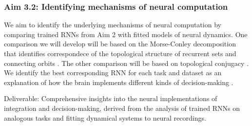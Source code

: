 \documentclass[12pt,letterpaper, onecolumn]{article}
\theoremstyle{definition}
\theoremstyle{remark}
\begin{document}
\subsubsection*{Aim 3.2: Identifying mechanisms of neural computation}
We aim to identify the underlying mechanisms of neural computation by comparing trained RNNs from Aim 2 with fitted models of neural dynamics.
 One comparison we will develop will be based on the Morse-Conley decomposition that identifies correspondece of the topological structure of recurrent sets and connecting orbits \citep{arai2009database, kaczynski2004computational}.
 The other comparison will be based on topological conjugacy \citep{ostrow2024beyond}.
We identify the best corresponding RNN for each task and dataset as an explanation of how the brain implements different kinds of decision-making \citep{levenstein2023}.
 


Deliverable:  Comprehensive insights into the neural implementations of integration and decision-making, derived from the analysis of trained RNNs on analogous tasks and fitting dynamical systems to neural recordings.

\newpage
\printbibliography
\end{document}
